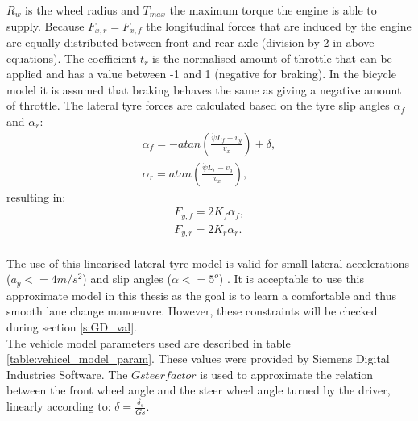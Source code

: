$R_w$ is the wheel radius and $T_{max}$ the maximum torque the engine is able to supply. Because $F_{x,r} = F_{x, f}$ the longitudinal forces that are induced by the engine are equally distributed between front and rear axle (division by 2 in above equations). The coefficient $t_r$ is the normalised amount of throttle that can be applied and has a value between -1 and 1 (negative for braking). In the bicycle model it is assumed that braking behaves the same as giving a negative amount of throttle.
The lateral tyre forces are calculated based on the tyre slip angles $\alpha_f$ and $\alpha_r$:
\begin{equation}\label{eq:bicycle_slipangle}
\begin{aligned}
\alpha_f = -atan(\frac{\dot{\psi} L_f + v_y}{v_x}) + \delta,\\
\alpha_r = atan(\frac{\dot{\psi} L_r - v_y}{v_x}),
\end{aligned}
\end{equation}
resulting in:
\begin{equation}\label{eq:bicycle_Fy}
\begin{aligned}
F_{y,f} = 2 K_f \alpha_f,\\
F_{y,r} = 2 K_r \alpha_r.
\end{aligned}
\end{equation}\\
The use of this linearised lateral tyre model is valid for small lateral accelerations ($a_y <= 4 m/s^2$) and slip angles ($\alpha <= 5^o$) \cite{TongDuySon2019}. It is acceptable to use this approximate model in this thesis as the goal is to learn a comfortable and thus smooth lane change manoeuvre. However, these constraints will be checked during section \ref{s:GD_val}.\\

The vehicle model parameters used are described in table \ref{table:vehicel_model_param}. These values were provided by Siemens Digital Industries Software. The $Gsteerfactor$ is used to approximate the relation between the front wheel angle and the steer wheel angle turned by the driver, linearly according to: $\delta = \frac{\delta_s}{Gs}$.  

